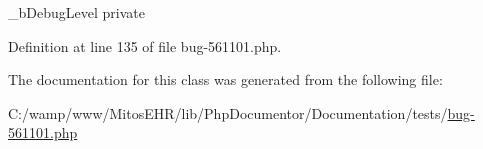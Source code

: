 \-\_\-b\-Debug\-Level  private 

\-Definition at line 135 of file bug-\/561101.\-php.



\-The documentation for this class was generated from the following file\-:\begin{DoxyCompactItemize}
\item 
\-C\-:/wamp/www/\-Mitos\-E\-H\-R/lib/\-Php\-Documentor/\-Documentation/tests/\hyperlink{bug-561101_8php}{bug-\/561101.\-php}\end{DoxyCompactItemize}
